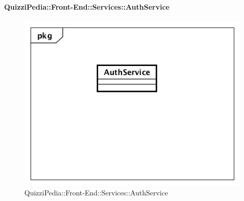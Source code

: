 \paragraph{QuizziPedia::Front-End::Services::AuthService}
\begin{figure}
	\centering
	\includegraphics[scale=0.45]{UML/Classi/Front-End/QuizziPedia_Front-end_Services_ AuthService.png}
	\caption{QuizziPedia::Front-End::Services::AuthService}
\end{figure}
